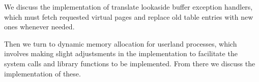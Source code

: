 We discuss the implementation of translate lookaside buffer exception
handlers, which must fetch requested virtual pages and replace old table
entries with new ones whenever needed.

Then we turn to dynamic memory allocation for userland processes, which
involves making slight adjustsments in the implementation to facilitate the
system calls and library functions to be implemented. From there we discuss
the implementation of these.

